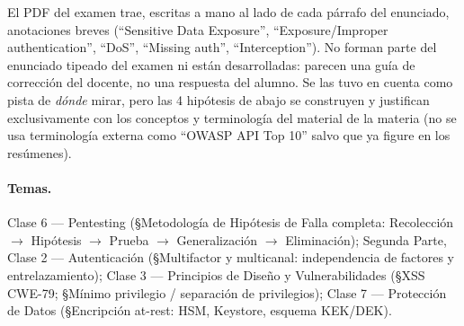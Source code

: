 \begin{ojo}
El PDF del examen trae, escritas a mano al lado de cada párrafo del enunciado, anotaciones
breves (``Sensitive Data Exposure'', ``Exposure/Improper authentication'', ``DoS'',
``Missing auth'', ``Interception''). No forman parte del enunciado tipeado del examen ni
están desarrolladas: parecen una guía de corrección del docente, no una respuesta del
alumno. Se las tuvo en cuenta como pista de \emph{dónde} mirar, pero las 4 hipótesis de abajo
se construyen y justifican exclusivamente con los conceptos y terminología del material de la
materia (no se usa terminología externa como ``OWASP API Top 10'' salvo que ya figure en los
resúmenes).
\end{ojo}

\paragraph{Temas.}
Clase 6 --- Pentesting (\S Metodología de Hipótesis de Falla completa: Recolección $\to$
Hipótesis $\to$ Prueba $\to$ Generalización $\to$ Eliminación); Segunda Parte, Clase 2 ---
Autenticación (\S Multifactor y multicanal: independencia de factores y entrelazamiento);
Clase 3 --- Principios de Diseño y Vulnerabilidades (\S XSS CWE-79; \S Mínimo privilegio /
separación de privilegios); Clase 7 --- Protección de Datos (\S Encripción at-rest: HSM,
Keystore, esquema KEK/DEK).

